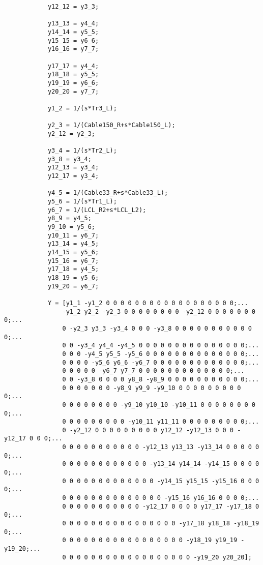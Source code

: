 \begin{appendices}
\begin{lstlisting}
            y12_12 = y3_3;

            y13_13 = y4_4;
            y14_14 = y5_5;
            y15_15 = y6_6;
            y16_16 = y7_7;

            y17_17 = y4_4;
            y18_18 = y5_5;
            y19_19 = y6_6;
            y20_20 = y7_7;

            y1_2 = 1/(s*Tr3_L);

            y2_3 = 1/(Cable150_R+s*Cable150_L);
            y2_12 = y2_3;

            y3_4 = 1/(s*Tr2_L);
            y3_8 = y3_4;
            y12_13 = y3_4;
            y12_17 = y3_4;

            y4_5 = 1/(Cable33_R+s*Cable33_L);
            y5_6 = 1/(s*Tr1_L);
            y6_7 = 1/(LCL_R2+s*LCL_L2);
            y8_9 = y4_5;
            y9_10 = y5_6;
            y10_11 = y6_7;
            y13_14 = y4_5;
            y14_15 = y5_6;
            y15_16 = y6_7;
            y17_18 = y4_5;
            y18_19 = y5_6;
            y19_20 = y6_7;

            Y = [y1_1 -y1_2 0 0 0 0 0 0 0 0 0 0 0 0 0 0 0 0 0 0;...
                -y1_2 y2_2 -y2_3 0 0 0 0 0 0 0 0 -y2_12 0 0 0 0 0 0 0 0;...
                0 -y2_3 y3_3 -y3_4 0 0 0 -y3_8 0 0 0 0 0 0 0 0 0 0 0 0;...
                0 0 -y3_4 y4_4 -y4_5 0 0 0 0 0 0 0 0 0 0 0 0 0 0 0;...
                0 0 0 -y4_5 y5_5 -y5_6 0 0 0 0 0 0 0 0 0 0 0 0 0 0;...
                0 0 0 0 -y5_6 y6_6 -y6_7 0 0 0 0 0 0 0 0 0 0 0 0 0;...
                0 0 0 0 0 -y6_7 y7_7 0 0 0 0 0 0 0 0 0 0 0 0 0;...
                0 0 -y3_8 0 0 0 0 y8_8 -y8_9 0 0 0 0 0 0 0 0 0 0 0;...
                0 0 0 0 0 0 0 -y8_9 y9_9 -y9_10 0 0 0 0 0 0 0 0 0 0;...
                0 0 0 0 0 0 0 0 -y9_10 y10_10 -y10_11 0 0 0 0 0 0 0 0 0;...
                0 0 0 0 0 0 0 0 0 -y10_11 y11_11 0 0 0 0 0 0 0 0 0;...
                0 -y2_12 0 0 0 0 0 0 0 0 0 y12_12 -y12_13 0 0 0 -y12_17 0 0 0;...
                0 0 0 0 0 0 0 0 0 0 0 -y12_13 y13_13 -y13_14 0 0 0 0 0 0;...
                0 0 0 0 0 0 0 0 0 0 0 0 -y13_14 y14_14 -y14_15 0 0 0 0 0;...
                0 0 0 0 0 0 0 0 0 0 0 0 0 -y14_15 y15_15 -y15_16 0 0 0 0;...
                0 0 0 0 0 0 0 0 0 0 0 0 0 0 -y15_16 y16_16 0 0 0 0;...
                0 0 0 0 0 0 0 0 0 0 0 -y12_17 0 0 0 0 y17_17 -y17_18 0 0;...
                0 0 0 0 0 0 0 0 0 0 0 0 0 0 0 0 -y17_18 y18_18 -y18_19 0;...
                0 0 0 0 0 0 0 0 0 0 0 0 0 0 0 0 0 -y18_19 y19_19 -y19_20;...
                0 0 0 0 0 0 0 0 0 0 0 0 0 0 0 0 0 0 -y19_20 y20_20];


\end{lstlisting}
\end{appendices}
